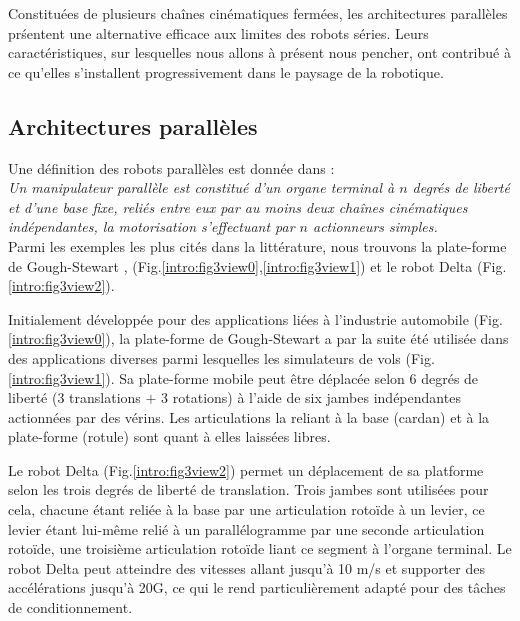 Constitu\'ees de plusieurs cha\^ines cin\'ematiques ferm\'ees, les 
architectures parallèles pr\'sentent une alternative efficace aux limites des 
robots s\'eries.  Leurs caractéristiques, sur lesquel\-les nous allons \`a 
pr\'esent nous pencher, ont contribué à ce qu'elles s'installent 
progressivement 
dans le paysage de la robotique.

\subsection{Architectures parallèles} \label{chap0-0-2}



Une définition des robots parallèles est donnée dans \cite{merlet1997robots} :\\
{\it Un manipulateur parallèle est constitué d’un organe terminal à $n$ degrés 
de li\-berté et d’une base fixe, reliés entre eux par au moins deux chaînes
cinématiques indépendantes, la motorisation s’effectuant par $n$ actionneurs 
simples.}\\

Parmi les exemples les plus cités dans la littérature, nous trouvons 
la plate-forme de Gough-Stewart \cite{1956:Gough}, \cite{1965:Stewart} 
(Fig.\ref{intro:fig3view0},\ref{intro:fig3view1}) et le robot Delta 
\cite{1988:Clavel} (Fig.\ref{intro:fig3view2}).

Initialement développée pour des applications li\'ees \`a l'industrie 
automobile (Fig.\ref{intro:fig3view0}), la plate-forme de Gough-Stewart a par 
la suite été utilisée dans des applications diverses parmi lesquelles les 
simulateurs de vols (Fig.\ref{intro:fig3view1}). Sa plate-forme mobile peut 
être déplacée selon 6 degrés de liberté (3 translations $+$ 3 rotations) à 
l'aide de six jambes indépendantes actionnées par des vérins. Les 
articulations la reliant à la base (cardan) et à la plate-forme (rotule) sont 
quant à elles laissées libres.

Le robot Delta (Fig.\ref{intro:fig3view2}) permet un déplacement de sa 
platforme selon les trois degrés de liberté de translation. Trois jambes sont 
utilisées pour cela, chacune étant reliée à la base par une articulation rotoïde 
à un levier, ce levier étant lui-même relié à un parallélogramme par une 
seconde articulation rotoïde, une troisième articulation rotoïde liant ce 
segment à l'organe terminal. Le robot Delta peut atteindre des vitesses allant 
jusqu'à 10 m/s et supporter des accélérations jusqu'à 20G, ce qui le rend 
particulièrement adapté pour des tâches de conditionnement.

